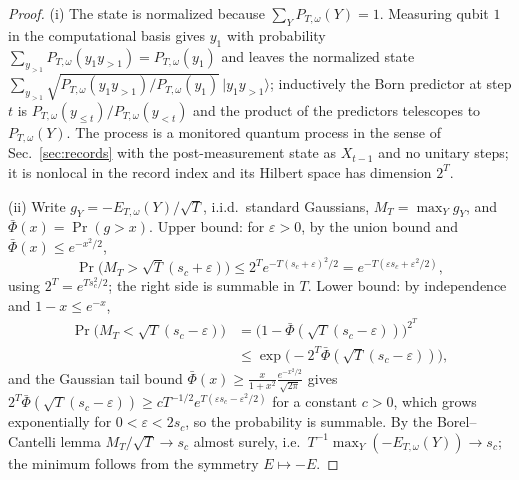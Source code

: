 \documentclass[aps,prx,reprint,superscriptaddress,nobibnotes,longbibliography]{revtex4-2}
\theoremstyle{remark}
\begin{document}
\begin{proof}
(i) The state is normalized because $\sum_YP_{T,\omega}(Y)=1$.  Measuring qubit $1$ in the computational basis gives $y_1$ with probability $\sum_{y_{>1}}P_{T,\omega}(y_1y_{>1})=P_{T,\omega}(y_1)$ and leaves the normalized state $\sum_{y_{>1}}\sqrt{P_{T,\omega}(y_1y_{>1})/P_{T,\omega}(y_1)}\,|y_1y_{>1}\rangle$; inductively the Born predictor at step $t$ is $P_{T,\omega}(y_{\le t})/P_{T,\omega}(y_{<t})$ and the product of the predictors telescopes to $P_{T,\omega}(Y)$.  The process is a monitored quantum process in the sense of Sec.~\ref{sec:records} with the post-measurement state as $X_{t-1}$ and no unitary steps; it is nonlocal in the record index and its Hilbert space has dimension $2^T$.

(ii) Write $g_Y=-E_{T,\omega}(Y)/\sqrt T$, i.i.d.\ standard Gaussians, $M_T=\max_Yg_Y$, and $\bar\Phi(x)=\Pr(g>x)$.  Upper bound: for $\varepsilon>0$, by the union bound and $\bar\Phi(x)\le e^{-x^2/2}$,
\begin{equation*}
 \Pr\bigl(M_T>\sqrt T(s_c+\varepsilon)\bigr)\le2^Te^{-T(s_c+\varepsilon)^2/2}=e^{-T(\varepsilon s_c+\varepsilon^2/2)},
\end{equation*}
using $2^T=e^{Ts_c^2/2}$; the right side is summable in $T$.  Lower bound: by independence and $1-x\le e^{-x}$,
\begin{align*}
 \Pr\bigl(M_T<\sqrt T(s_c-\varepsilon)\bigr)&=\bigl(1-\bar\Phi(\sqrt T(s_c-\varepsilon))\bigr)^{2^T}\\
 &\le\exp\bigl(-2^T\bar\Phi(\sqrt T(s_c-\varepsilon))\bigr),
\end{align*}
and the Gaussian tail bound $\bar\Phi(x)\ge\frac{x}{1+x^2}\frac{e^{-x^2/2}}{\sqrt{2\pi}}$ gives $2^T\bar\Phi(\sqrt T(s_c-\varepsilon))\ge cT^{-1/2}e^{T(\varepsilon s_c-\varepsilon^2/2)}$ for a constant $c>0$, which grows exponentially for $0<\varepsilon<2s_c$, so the probability is summable.  By the Borel--Cantelli lemma $M_T/\sqrt T\to s_c$ almost surely, i.e.\ $T^{-1}\max_Y(-E_{T,\omega}(Y))\to s_c$; the minimum follows from the symmetry $E\mapsto-E$.


\end{proof}
\end{document}
